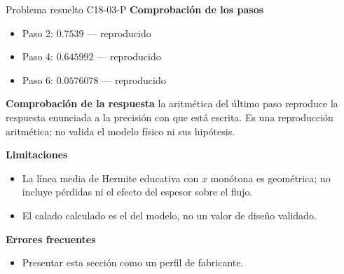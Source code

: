 \documentclass[10pt,openany]{book}
\begin{document}
\begin{studiumworked}{Problema resuelto C18-03-P}
\noindent\textbf{Comprobación de los pasos}
\begin{itemize}
\item Paso 2: $0.7539$ — reproducido
\item Paso 4: $0.645992$ — reproducido
\item Paso 6: $0.0576078$ — reproducido
\end{itemize}

\noindent\textbf{Comprobación de la respuesta} la aritmética del último paso reproduce la respuesta enunciada a la precisión con que está escrita. Es una reproducción aritmética; no valida el modelo físico ni sus hipótesis.

\noindent\textbf{Limitaciones}
\begin{itemize}
\item La línea media de Hermite educativa con $x$ monótona es geométrica; no incluye pérdidas ni el efecto del espesor sobre el flujo.
\item El calado calculado es el del modelo, no un valor de diseño validado.
\end{itemize}

\noindent\textbf{Errores frecuentes}
\begin{itemize}
\item Presentar esta sección como un perfil de fabricante.
\end{itemize}
\end{studiumworked}
\end{document}
